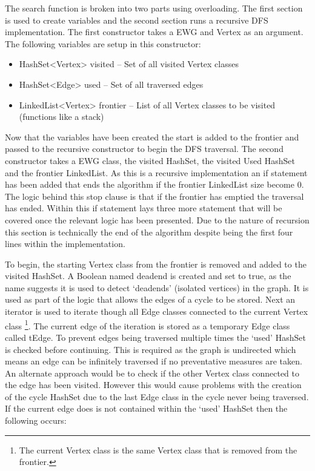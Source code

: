 \documentclass{AISB2008}
\begin{document}
The search function is broken into two parts using overloading. The first section is used to create variables and the second section runs a recursive DFS implementation. The first constructor takes a EWG and Vertex as an argument. 
The following variables are setup in this constructor:

\begin{itemize}
\item HashSet<Vertex> visited – Set of all visited Vertex classes
\item HashSet<Edge> used – Set of all traversed edges
\item LinkedList<Vertex> frontier – List of all Vertex classes to be visited (functions like a stack)
\end{itemize}

Now that the variables have been created the start is added to the frontier and passed to the recursive constructor to begin the DFS traversal. The second constructor takes a EWG class, the visited HashSet, the visited Used HashSet and the frontier LinkedList. As this is a recursive implementation an if statement has been added that ends the algorithm if the frontier LinkedList size become 0. The logic behind this stop clause is that if the frontier has emptied the traversal has ended. Within this if statement lays three more statement that will be covered once the relevant logic has been presented. Due to the nature of recursion this section is technically the end of the algorithm despite being the first four lines within the implementation.

To begin, the starting Vertex class from the frontier is removed and added to the visited HashSet. A Boolean named deadend is created and set to true, as the name suggests it is used to detect ‘deadends’ (isolated vertices) in the graph. It is used as part of the logic that allows the edges of a cycle to be stored.  Next an iterator is used to iterate though all Edge classes connected to the current Vertex class  \footnote{The current Vertex class is the same Vertex class that is removed from the frontier.}. The current edge of the iteration is stored as a temporary Edge class called tEdge. To prevent edges being traversed multiple times the ‘used’ HashSet is checked before continuing. This is required as the graph is undirected which means an edge can be infinitely traversed if no preventative measures are taken. An alternate approach would be to check if the other Vertex class connected to the edge has been visited. However this would cause problems with the creation of the cycle HashSet due to the last Edge class in the cycle never being traversed.
If the current edge does is not contained within the ‘used’ HashSet then the following occurs:
\end{document}

